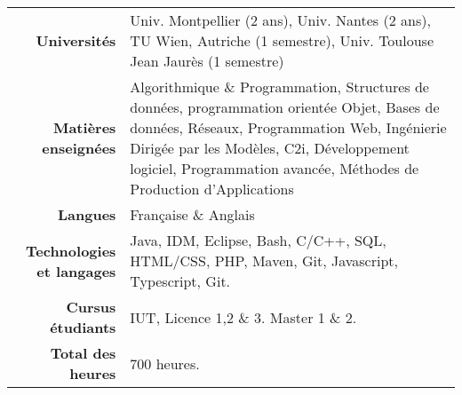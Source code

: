 
\begin{tabular}{r @{~$\rangle$~} p{}}

\textbf{Universités} & Univ. Montpellier (2 ans), Univ. Nantes (2 ans), TU Wien, Autriche (1 semestre), Univ. Toulouse Jean Jaurès (1 semestre) \\

\textbf{Matières enseignées} & Algorithmique \& Programmation, Structures de données, programmation orientée Objet, Bases de données, Réseaux, Programmation Web, Ingénierie Dirigée par les Modèles, C2i, Développement logiciel, Programmation avancée, Méthodes de Production d'Applications \\

\textbf{Langues} & Française \& Anglais \\

\textbf{Technologies et langages} & Java, IDM, Eclipse, Bash, C/C++, SQL, HTML/CSS, PHP, Maven, Git, Javascript, Typescript, Git.\\

\textbf{Cursus étudiants} & IUT, Licence 1,2 \& 3. Master 1 \& 2. \\

\textbf{Total des heures} & $700$ heures. \\
\end{tabular}

